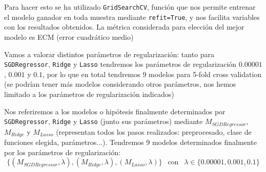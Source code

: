 \documentclass[11pt,a4paper]{article}
\theoremstyle{definition}
\begin{document}
	Para hacer esto se ha utilizado \texttt{GridSearchCV}, función que nos permite entrenar el modelo ganador en toda muestra mediante \texttt{refit=True}, y nos facilita variables con los resultados obtenidos. La métrica considerada para elección del mejor modelo es ECM (error cuadrático medio)
	
	Vamos a valorar distintos parámetros de regularización: tanto para \texttt{SGDRegressor}, \texttt{Ridge} y \texttt{Lasso} tendremos los parámetros de regularización $0.00001$, $0.001$ y $0.1$, por lo que en total tendremos 9 modelos para 5-fold cross validation (se podrían tener más modelos considerando otros parámetros, nos hemos limitado a los parámetros de regularización indicados)
	
	Nos referiremos a los modelos o hipótesis finalmente determinados por \texttt{SGDRegressor}, \texttt{Ridge} y \texttt{Lasso} (junto sus parámetros) mediante $M_{SGDRegressor}$, $M_{Ridge}$ y $M_{Lasso}$ (representan todos los pasos realizados: preprocesado, clase de funciones elegida, parámetros...). Tendremos 9 modelos determinados finalmente por los parámetros de regularización: $$\{(M_{SGDRegressor},\lambda),(M_{Ridge},\lambda),(M_{Lasso},\lambda)\} \ \ \text{ con } \ \ \lambda \in \{0.00001, 0.001, 0.1\}$$
	
\end{document}
